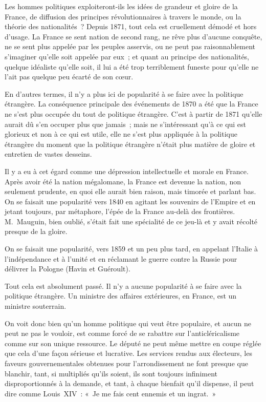 \documentclass[french,twoside]{book} %
\begin{document}
Les hommes politiques exploiteront-ils les idées de grandeur et gloire de la France, de diffusion des principes révolutionnaires à travers le monde, ou la théorie des nationalités ? Depuis 1871, tout cela est cruellement démodé et hors d’usage. La France se sent nation de second rang, ne rêve plus d’aucune conquête, ne se sent plus appelée par les peuples asservis, ou ne peut pas raisonnablement s’imaginer qu’elle soit appelée par eux ; et quant au principe des nationalités, quelque idéaliste qu’elle soit, il lui a été trop terriblement funeste pour qu’elle ne l’ait pas quelque peu écarté de son cœur.\par
En d’autres termes, il n’y a plus ici de popularité à se faire avec la politique étrangère. La conséquence principale des événements de 1870 a été que la France ne s’est plus occupée du tout de politique étrangère. C’est à partir de 1871 qu’elle aurait dû s’en occuper plus que jamais ; mais ne s’intéressant qu’à ce qui est glorieux et non à ce qui est utile, elle ne s’est plus appliquée à la politique  étrangère du moment que la politique étrangère n’était plus matière de gloire et entretien de vastes desseins.\par
Il y a eu à cet égard comme une dépression intellectuelle et morale en France. Après avoir été la nation mégalomane, la France est devenue la nation, non seulement prudente, en quoi elle aurait bien raison, mais timorée et parlant bas. On se faisait une popularité vers 1840 en agitant les souvenirs de l’Empire et en jetant toujours, par métaphore, l’épée de la France au-delà des frontières. M. Mauguin, bien oublié, s’était fait une spécialité de ce jeu-là et y avait récolté presque de la gloire.\par
On se faisait une popularité, vers 1859 et un peu plus tard, en appelant l’Italie à l’indépendance et à l’unité et en réclamant le guerre contre la Russie pour délivrer la Pologne (Havin et Guéroult).\par
Tout cela est absolument passé. Il n’y a aucune popularité à se faire avec la politique étrangère. Un ministre des affaires extérieures, en France, est un ministre souterrain.\par
On voit donc bien qu’un homme politique qui veut être populaire, et aucun ne peut ne pas le vouloir, est comme forcé de se rabattre sur l’anticléricalisme comme sur son unique ressource. Le député ne peut même mettre en coupe réglée que  cela d’une façon sérieuse et lucrative. Les services rendus aux électeurs, les faveurs gouvernementales obtenues pour l’arrondissement ne font presque que blanchir, tant, si multipliés qu’ils soient, ils sont toujours infiniment disproportionnés à la demande, et tant, à chaque bienfait qu’il dispense, il peut dire comme Louis XIV : « Je me fais cent ennemis et un ingrat. »\par
\end{document}
